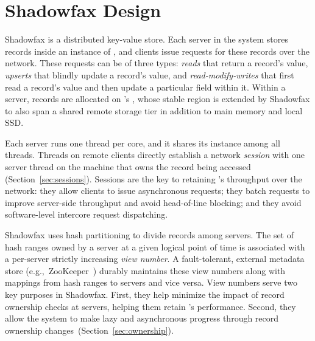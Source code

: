 \section{Shadowfax Design}
\label{sec:design}

Shadowfax is a distributed key-value store.
%
Each server in the system stores records inside an instance of
\faster, and clients issue requests for these records over the network.
%
These requests can be of three types: \emph{reads} that return a
record's value, \emph{upserts} that blindly update a record's value, and
\emph{read-modify-writes} that first read a record's value and then
update a particular field within it.
%
Within a server, records are allocated on \faster's \hlog, whose stable
region is extended by Shadowfax to
also span a shared remote storage tier in addition to main memory and
local SSD.

Each server runs one thread per core, and it shares its \faster instance among all threads.
%
Threads on remote clients directly establish a network \emph{session} with one
server thread on the machine that owns the record being accessed
(Section~\ref{sec:sessions}).
%
Sessions are the key to retaining \faster{}'s throughput over the
network:
%
they allow clients to issue asynchronous requests;
they batch requests to improve server-side throughput and avoid
  head-of-line blocking;
and they avoid software-level intercore request dispatching.

Shadowfax uses hash partitioning to divide records among servers.
%
The set of hash ranges owned by a server at a given logical point of
time is associated with a per-server strictly increasing \emph{view
number}.
%
A fault-tolerant, external metadata store (e.g.,\ ZooKeeper~\cite{zookeeper})
durably maintains these view numbers along with mappings from hash ranges to
servers and vice versa.
%
View numbers serve two key purposes in Shadowfax.
%
First, they help minimize the impact of record ownership checks at servers,
helping them retain \faster's performance.
%
Second, they allow the system to make lazy and asynchronous progress
through record ownership changes~(Section~\ref{sec:ownership}).


